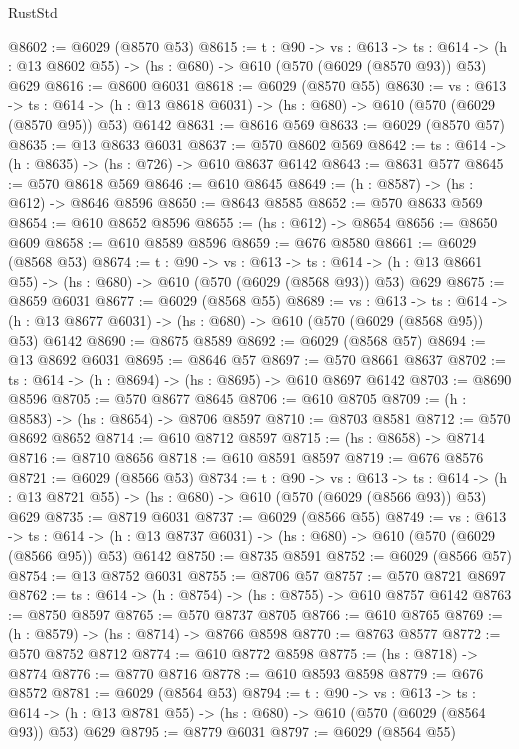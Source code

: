 \begin{lexlean}{RustStd}
\begin{coremodule}
@8602 := @6029 (@8570 @53)
@8615 := {t : @90} ->
  {vs : @613} ->
  {ts : @614} -> (h : @13 @8602 @55) -> (hs : @680) -> @610 (@570 (@6029 (@8570 @93)) @53) @629
@8616 := @8600 @6031
@8618 := @6029 (@8570 @55)
@8630 := {vs : @613} ->
  {ts : @614} -> (h : @13 @8618 @6031) -> (hs : @680) -> @610 (@570 (@6029 (@8570 @95)) @53) @6142
@8631 := @8616 @569
@8633 := @6029 (@8570 @57)
@8635 := @13 @8633 @6031
@8637 := @570 @8602 @569
@8642 := {ts : @614} -> (h : @8635) -> (hs : @726) -> @610 @8637 @6142
@8643 := @8631 @577
@8645 := @570 @8618 @569
@8646 := @610 @8645
@8649 := (h : @8587) -> (hs : @612) -> @8646 @8596
@8650 := @8643 @8585
@8652 := @570 @8633 @569
@8654 := @610 @8652 @8596
@8655 := (hs : @612) -> @8654
@8656 := @8650 @609
@8658 := @610 @8589 @8596
@8659 := @676 @8580
@8661 := @6029 (@8568 @53)
@8674 := {t : @90} ->
  {vs : @613} ->
  {ts : @614} -> (h : @13 @8661 @55) -> (hs : @680) -> @610 (@570 (@6029 (@8568 @93)) @53) @629
@8675 := @8659 @6031
@8677 := @6029 (@8568 @55)
@8689 := {vs : @613} ->
  {ts : @614} -> (h : @13 @8677 @6031) -> (hs : @680) -> @610 (@570 (@6029 (@8568 @95)) @53) @6142
@8690 := @8675 @8589
@8692 := @6029 (@8568 @57)
@8694 := @13 @8692 @6031
@8695 := @8646 @57
@8697 := @570 @8661 @8637
@8702 := {ts : @614} -> (h : @8694) -> (hs : @8695) -> @610 @8697 @6142
@8703 := @8690 @8596
@8705 := @570 @8677 @8645
@8706 := @610 @8705
@8709 := (h : @8583) -> (hs : @8654) -> @8706 @8597
@8710 := @8703 @8581
@8712 := @570 @8692 @8652
@8714 := @610 @8712 @8597
@8715 := (hs : @8658) -> @8714
@8716 := @8710 @8656
@8718 := @610 @8591 @8597
@8719 := @676 @8576
@8721 := @6029 (@8566 @53)
@8734 := {t : @90} ->
  {vs : @613} ->
  {ts : @614} -> (h : @13 @8721 @55) -> (hs : @680) -> @610 (@570 (@6029 (@8566 @93)) @53) @629
@8735 := @8719 @6031
@8737 := @6029 (@8566 @55)
@8749 := {vs : @613} ->
  {ts : @614} -> (h : @13 @8737 @6031) -> (hs : @680) -> @610 (@570 (@6029 (@8566 @95)) @53) @6142
@8750 := @8735 @8591
@8752 := @6029 (@8566 @57)
@8754 := @13 @8752 @6031
@8755 := @8706 @57
@8757 := @570 @8721 @8697
@8762 := {ts : @614} -> (h : @8754) -> (hs : @8755) -> @610 @8757 @6142
@8763 := @8750 @8597
@8765 := @570 @8737 @8705
@8766 := @610 @8765
@8769 := (h : @8579) -> (hs : @8714) -> @8766 @8598
@8770 := @8763 @8577
@8772 := @570 @8752 @8712
@8774 := @610 @8772 @8598
@8775 := (hs : @8718) -> @8774
@8776 := @8770 @8716
@8778 := @610 @8593 @8598
@8779 := @676 @8572
@8781 := @6029 (@8564 @53)
@8794 := {t : @90} ->
  {vs : @613} ->
  {ts : @614} -> (h : @13 @8781 @55) -> (hs : @680) -> @610 (@570 (@6029 (@8564 @93)) @53) @629
@8795 := @8779 @6031
@8797 := @6029 (@8564 @55)

\end{coremodule}
\end{lexlean}
